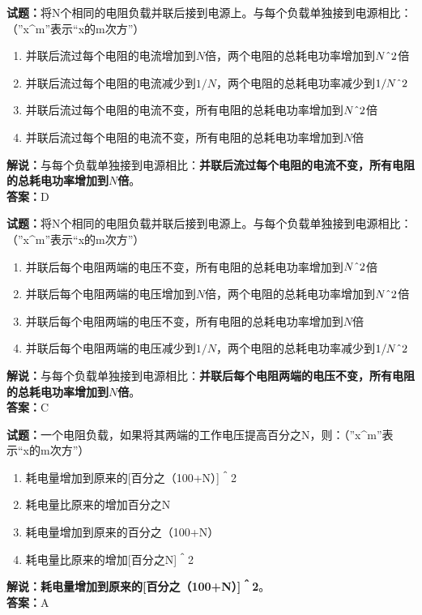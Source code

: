 \documentclass{ctexbook}
\begin{document}
\vspace{1em}

\textbf{试题：}将N个相同的电阻负载并联后接到电源上。与每个负载单独接到电源相比：（”x\string^m”表示“x的m次方”）
\begin{enumerate}[leftmargin=3em]
  \item 并联后流过每个电阻的电流增加到\(N\)倍，两个电阻的总耗电功率增加到\(N\string^2\)倍
  \item 并联后流过每个电阻的电流减少到\(1/N\)，两个电阻的总耗电功率减少到\(1/N\string^2\)
  \item 并联后流过每个电阻的电流不变，所有电阻的总耗电功率增加到\(N\string^2\)倍
  \item 并联后流过每个电阻的电流不变，所有电阻的总耗电功率增加到\(N\)倍
\end{enumerate}
\noindent\textbf{解说：}与每个负载单独接到电源相比：\textbf{并联后流过每个电阻的电流不变，所有电阻的总耗电功率增加到\(N\)倍}。\\\noindent\textbf{答案：}D

\vspace{1em}

\textbf{试题：}将N个相同的电阻负载并联后接到电源上。与每个负载单独接到电源相比：（”x\string^m”表示“x的m次方”）
\begin{enumerate}[leftmargin=3em]
  \item 并联后每个电阻两端的电压不变，所有电阻的总耗电功率增加到\(N\string^2\)倍
  \item 并联后每个电阻两端的电压增加到\(N\)倍，两个电阻的总耗电功率增加到\(N\string^2\)倍
  \item 并联后每个电阻两端的电压不变，所有电阻的总耗电功率增加到\(N\)倍
  \item 并联后每个电阻两端的电压减少到\(1/N\)，两个电阻的总耗电功率减少到\(1/N\string^2\)
\end{enumerate}
\noindent\textbf{解说：}与每个负载单独接到电源相比：\textbf{并联后每个电阻两端的电压不变，所有电阻的总耗电功率增加到\(N\)倍}。\\\noindent\textbf{答案：}C

\vspace{1em}

\textbf{试题：}一个电阻负载，如果将其两端的工作电压提高百分之N，则：（”x\string^m”表示“x的m次方”）
\begin{enumerate}[leftmargin=3em]
  \item 耗电量增加到原来的[百分之（100+N）]＾2
  \item 耗电量比原来的增加百分之N
  \item 耗电量增加到原来的百分之（100+N）
  \item 耗电量比原来的增加[百分之N]＾2
\end{enumerate}
\noindent\textbf{解说：}\textbf{耗电量增加到原来的[百分之（100+N）]＾2}。\\\noindent\textbf{答案：}A
\end{document}
